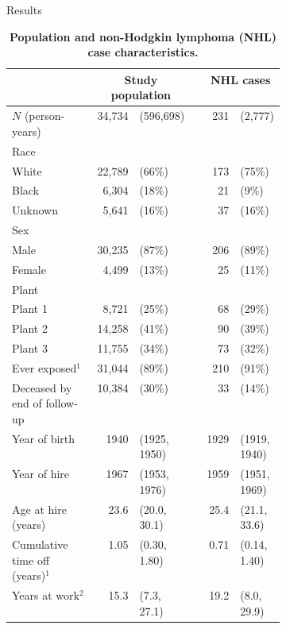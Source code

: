 \documentclass[final]{beamer}
\newlength{\onecolwid}
\begin{document}
\begin{frame}[t]
\begin{columns}[t,onlytextwidth,totalwidth=\onecolwid]
\begin{column}{\onecolwid}
\begin{block}{Results}
\begin{table}\renewcommand{\arraystretch}{1.1}
\caption{\bfseries Population and non-Hodgkin lymphoma (NHL) case characteristics.}
\small
\begin{tabular}{p{0.4\linewidth}rlcrl}
  \toprule
 & \multicolumn{2}{c}{Study population} 	&  & \multicolumn{2}{c}{NHL cases} \\
  \midrule
	$N$ (person-years) & 34,734 & (596,698) &  & 231 & (2,777) \\
  Race &  &  &  &  &  \\
  \hspace{1em}White & 22,789 & (66\%) 		&  & 173 & (75\%) \\
  \hspace{1em}Black & 6,304 & (18\%) 			&  & 21 & (9\%) \\
  \hspace{1em}Unknown & 5,641 & (16\%) 		&  & 37 & (16\%) \\
  Sex &  &  &  &  &  \\
  \hspace{1em}Male & 30,235 & (87\%)		 	&  & 206 & (89\%) \\
  \hspace{1em}Female & 4,499 & (13\%) 		&  & 25 & (11\%) \\
  Plant &  &  &  &  &  \\
  \hspace{1em}Plant 1 & 8,721 & (25\%) 		&  & 68 & (29\%) \\
  \hspace{1em}Plant 2 & 14,258 & (41\%) 	&  & 90 & (39\%) \\
  \hspace{1em}Plant 3 & 11,755 & (34\%) 	&  & 73 & (32\%) \\
  Ever exposed$^1$
											& 31,044 & (89\%) 	&  & 210 & (91\%) \\
	Deceased by end of follow-up
																					& 10,384 & (30\%) 	&  & 33 & (14\%) \\
  \hline
  Year of birth & 1940 & (1925, 1950) 		&  & 1929 & (1919, 1940) \\
  Year of hire & 1967 & (1953, 1976) 			&  & 1959 & (1951, 1969) \\
  Age at hire (years) & 23.6 & (20.0, 30.1)					 		&  & 25.4 & (21.1, 33.6) \\
	Cumulative time off (years)$^1$ & 1.05 & (0.30, 1.80) &  & 0.71 & (0.14, 1.40) \\
  Years at work$^2$ & 15.3 & (7.3, 27.1) 								&  & 19.2 & (8.0, 29.9) \\

\end{tabular}
\end{table}
\end{block}
\end{column}
\end{columns}
\end{frame}
\end{document}

